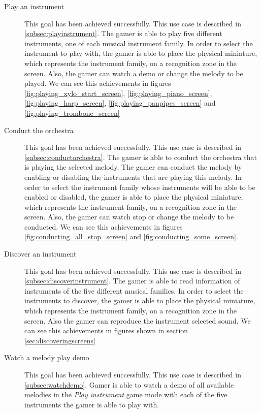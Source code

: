 \begin{description}
\item[Play an instrument]
This goal has been achieved successfully. This use case is described in \ref{subsec:playinstrument}. The gamer is able to play five different instruments, one of each musical instrument family. In order to select the instrument to play with, the gamer is able to place the physical miniature, which represents the instrument family, on a recognition zone in the screen. Also, the gamer can watch a demo or change the melody to be played. We can see this achievements in figures \ref{fig:playing_xylo_start_screen}, \ref{fig:playing_piano_screen}, \ref{fig:playing_harp_screen}, \ref{fig:playing_panpipes_screen} and \ref{fig:playing_trombone_screen}

\item[Conduct the orchestra]
This goal has been achieved successfully. This use case is described in \ref{subsec:conductorchestra}. The gamer is able to conduct the orchestra that is playing the selected melody. The gamer can conduct the melody by enabling or disabling the instruments that are playing this melody. In order to select the instrument family whose instruments will be able to be enabled or disabled, the gamer is able to place the physical miniature, which represents the instrument family, on a recognition zone in the screen. Also, the gamer can watch stop or change the melody to be conducted. We can see this achievements in figures \ref{fig:conducting_all_stop_screen} and \ref{fig:conducting_some_screen}.

\item[Discover an instrument]
This goal has been achieved successfully. This use case is described in \ref{subsec:discoverinstrument}. The gamer is able to read information of instruments of the five different musical families. In order to select the instruments to discover, the gamer is able to place the physical miniature, which represents the instrument family, on a recognition zone in the screen. Also the gamer can reproduce the instrument selected sound. We can see this achievements in figures shown in section \ref{sec:discoveringscreens}

\item[Watch a melody play demo]
This goal has been achieved successfully. This use case is described in \ref{subsec:watchdemo}. Gamer is able to watch a demo of all available melodies in the \textit{Play instrument} game mode with each of the five instruments the gamer is able to play with.


\end{description}
